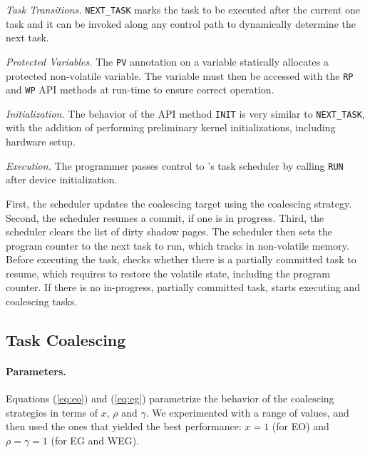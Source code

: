 \noindent\textit{Task Transitions.} \texttt{NEXT\_TASK} marks the task to be executed after the current one task and it can be invoked along
any control path to dynamically determine the next task.

\noindent\textit{Protected Variables.} The \texttt{PV} annotation on a
variable statically allocates a protected non-volatile variable. The
variable must then be accessed with the \texttt{RP} and \texttt{WP} API methods at
run-time to ensure correct operation.

\noindent\textit{Initialization.} The behavior of the API method
\texttt{INIT} is very similar to \texttt{NEXT\_TASK}, with the
addition of performing preliminary kernel initializations, including hardware setup.

\noindent\textit{Execution.} The programmer passes control to \sys's task scheduler 
by calling \texttt{RUN} after device initialization. 

First, the scheduler updates the coalescing target using the coalescing
strategy.  Second, the scheduler resumes a commit, if one is in progress. Third,
the scheduler clears the list of dirty shadow pages. The scheduler then 
sets the program counter to the next task to run, which \sys tracks in  
non-volatile memory.  
%
Before executing the task, \sys checks whether there is a partially committed
task to resume, which requires \sys to restore the volatile state, including the program
counter.  
%
If there is no in-progress, partially committed task, \sys starts executing and
coalescing tasks. 

%
\subsection{Task Coalescing}
%
%
\paragraph{Parameters.}
Equations (\ref{eq:eo}) and (\ref{eq:eg}) parametrize the behavior of the coalescing strategies in terms of $x$, $\rho$ and $\gamma$.
We experimented with a range of values, and then used the ones that yielded the best performance: $x = 1$ (for EO) and $\rho = \gamma = 1$ (for EG and WEG).

